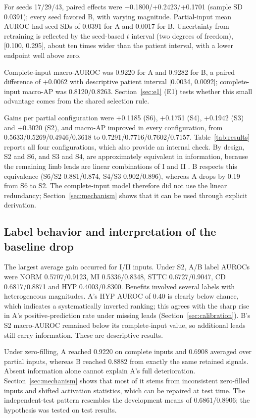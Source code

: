 For seeds 17/29/43, paired effects were +0.1800/+0.2423/+0.1701 (sample SD 0.0391); every seed favored B, with varying magnitude. Partial-input mean AUROC had seed SDs of 0.0391 for A and 0.0017 for B. Uncertainty from retraining is reflected by the seed-based $t$ interval (two degrees of freedom), [0.100, 0.295], about ten times wider than the patient interval, with a lower endpoint well above zero.

Complete-input macro-AUROC was 0.9220 for A and 0.9282 for B, a paired difference of +0.0062 with descriptive patient interval [0.0034, 0.0092]; complete-input macro-AP was 0.8120/0.8263. Section~\ref{sec:e1} (E1) tests whether this small advantage comes from the shared selection rule.

Gains per partial configuration were +0.1185 (S6), +0.1751 (S4), +0.1942 (S3) and +0.3020 (S2), and macro-AP improved in every configuration, from 0.5633/0.5269/0.4946/0.3618 to 0.7291/0.7716/0.7602/0.7157. Table~\ref{tab:results} reports all four configurations, which also provide an internal check. By design, S2 and S6, and S3 and S4, are approximately equivalent in information, because the remaining limb leads are linear combinations of I and II \citep{reyna2022issues}. B respects this equivalence (S6/S2 0.881/0.874, S4/S3 0.902/0.896), whereas A drops by 0.19 from S6 to S2. The complete-input model therefore did not use the linear redundancy; Section~\ref{sec:mechanism} shows that it can be used through explicit derivation.

\subsection{Label behavior and interpretation of the baseline drop}
\label{sec:labels}

The largest average gain occurred for I/II inputs. Under S2, A/B label AUROCs were NORM 0.5707/0.9123, MI 0.5336/0.8348, STTC 0.6727/0.9047, CD 0.6817/0.8871 and HYP 0.4003/0.8300. Benefits involved several labels with heterogeneous magnitudes. A's HYP AUROC of 0.40 is clearly below chance, which indicates a systematically inverted ranking; this agrees with the sharp rise in A's positive-prediction rate under missing leads (Section~\ref{sec:calibration}). B's S2 macro-AUROC remained below its complete-input value, so additional leads still carry information. These are descriptive results.

Under zero-filling, A reached 0.9220 on complete inputs and 0.6908 averaged over partial inputs, whereas B reached 0.8882 from exactly the same retained signals. Absent information alone cannot explain A's full deterioration. Section~\ref{sec:mechanism} shows that most of it stems from inconsistent zero-filled inputs and shifted activation statistics, which can be repaired at test time. The independent-test pattern resembles the development means of 0.6861/0.8906; the hypothesis was tested on test results.


